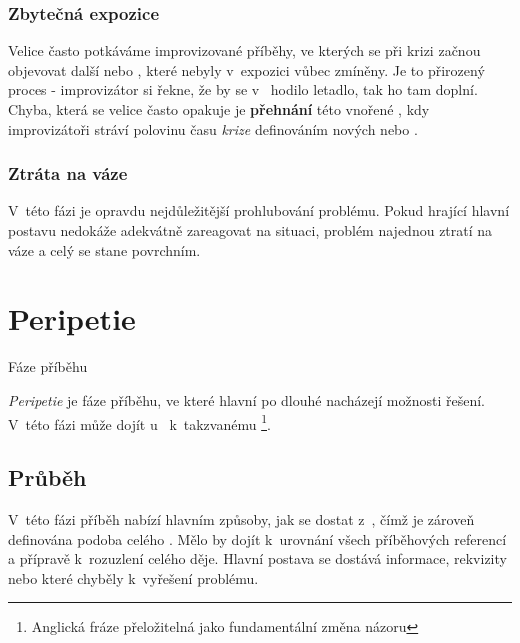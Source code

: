 \subsubsection{ Zbytečná expozice } Velice často potkáváme improvizované příběhy, ve kterých se při krizi začnou objevovat další  nebo , které nebyly v~expozici vůbec zmíněny. Je to přirozený proces - improvizátor si řekne, že by se v~ hodilo letadlo, tak ho tam doplní. Chyba, která se velice často opakuje je \textbf{přehnání} této vnořené , kdy improvizátoři stráví polovinu času \textit{krize} definováním nových  nebo . 
 
\subsubsection{ Ztráta na váze } V~této fázi je opravdu nejdůležitější prohlubování problému. Pokud  hrající hlavní postavu nedokáže adekvátně zareagovat na situaci, problém najednou ztratí na váze a celý  se stane povrchním. 
 
\begin{quote} 
\end{quote} 
 
 
 
 
\needspace{5cm} \section{Peripetie} \label{peripetie} {{Fáze příběhu}} 
 
\textit{Peripetie} je fáze příběhu, ve které hlavní  po dlouhé  nacházejí možnosti řešení. V~této fázi může dojít u~ k~takzvanému  \footnote{Anglická fráze přeložitelná jako fundamentální změna názoru}. 
 
\subsection{ Průběh } V~této fázi příběh nabízí hlavním  způsoby, jak se dostat z~, čímž je zároveň definována podoba  celého . Mělo by dojít k~urovnání všech příběhových referencí a přípravě k~rozuzlení celého děje. Hlavní postava se dostává informace, rekvizity nebo které chyběly k~vyřešení problému. 
 
